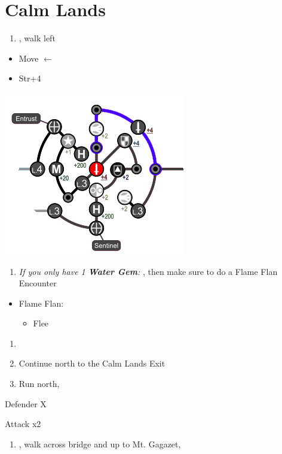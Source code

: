 \chapter{Calm Lands}

\begin{enumerate}
  \item \sd, walk left
\end{enumerate}
\begin{spheregrid}
  \begin{itemize}
  \yunaf
  \begin{itemize}
  \item Move $\leftarrow$
  \item Str+4
  \end{itemize}
  \includegraphics[width=.5\columnwidth]{graphics/yuna_blitz_win_highbridge_2}
\end{itemize}
\end{spheregrid}
\begin{enumerate}[resume]
  \item \textit{If you only have 1 \textbf{Water Gem}:} \formation{\tidus}{\auron}{\yuna}, then make sure to do a Flame Flan Encounter
\end{enumerate}
\begin{encounters}
\begin{itemize}
\item Flame Flan:
\begin{itemize}
\kimahrif Steal
\item Flee
\end{itemize}
\end{itemize}
\end{encounters}
\begin{enumerate}[resume]
  \item \formation{\tidus}{\kimahri}{\auron}
  \item Continue north to the Calm Lands Exit
  \item Run north, \sd
\end{enumerate}
\begin{battle}[64000]{Defender X}
  \begin{itemize}
    \switch{\tidus}{\yuna}
    \summon{\bahamut}
    \bahamutf Attack x2
  \end{itemize}
\end{battle}
\begin{enumerate}[resume]
  \item \sd, walk across bridge and up to Mt. Gagazet, \sd
\end{enumerate}
